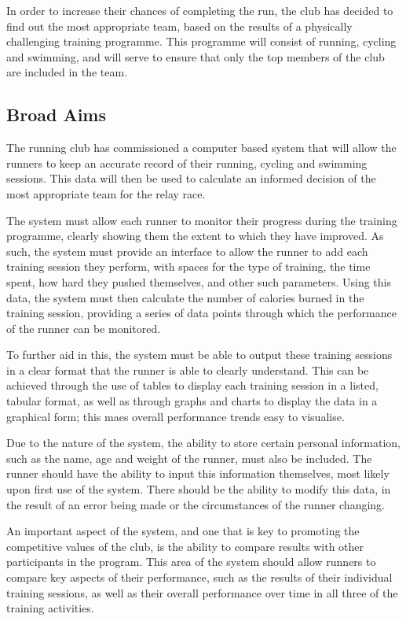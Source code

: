 \documentclass{article}[12pt,a4paper]
\begin{document}
In order to increase their chances of completing the run, the club has decided to find out the most appropriate team, based on the results of a physically challenging training programme. This programme will consist of running, cycling and swimming, and will serve to ensure that only the top members of the club are included in the team.

\subsection{Broad Aims}
The running club has commissioned  a computer based system that will allow the runners to keep an accurate record of their running, cycling and swimming sessions. This data will then be used to calculate an informed decision of the most appropriate team for the relay race.

The system must allow each runner to monitor their progress during the training programme, clearly showing them the extent to which they have improved. As such, the system must provide an interface to allow the runner to add each training session they perform, with spaces for the type of training, the time spent, how hard they pushed themselves, and other such parameters. Using this data, the system must then calculate the number of calories burned in the training session, providing a series of data points through which the performance of the runner can be monitored.

To further aid in this, the system must be able to output these training sessions in a clear format that the runner is able to clearly understand. This can be achieved through the use of tables to display each training session in a listed, tabular format, as well as through graphs and charts to display the data in a graphical form; this maes overall performance trends easy to visualise.

Due to the nature of the system, the ability to store certain personal information, such as the name, age and weight of the runner, must also be included. The runner should have the ability to input this information themselves, most likely upon first use of the system. There should be the ability to modify this data, in the result of an error being made or the circumstances of the runner changing.

An important aspect of the system, and one that is key to promoting the competitive values of the club, is the ability to compare results with other participants in the program. This area of the system should allow runners to compare key aspects of their performance, such as the results of their individual training sessions, as well as their overall performance over time in all three of the training activities.
\end{document}
